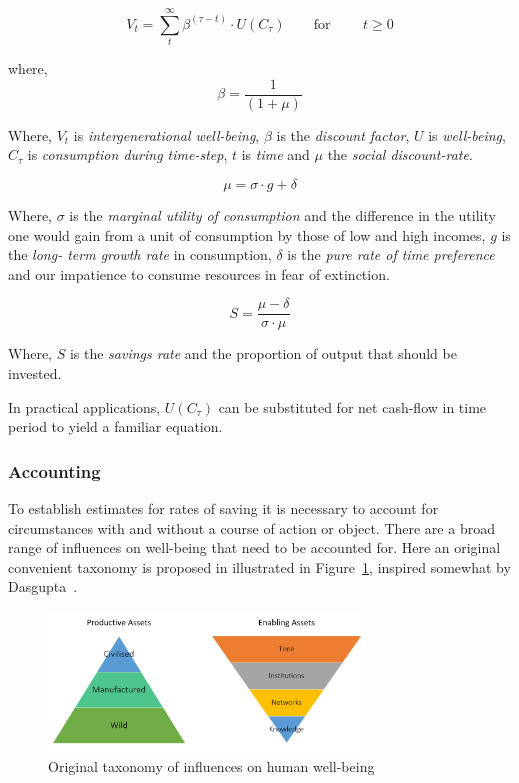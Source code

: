 \documentclass[11pt, oneside]{article}   	%
\begin{document}
\begin{equation}
V_t = \sum_t^\infty \beta^{(\tau - t)} \cdot U (C_\tau)
\qquad \text{for }
\qquad t \geq 0
\end{equation}

where,
\begin{equation}
\beta = \frac{1}{(1+\mu)}
\end{equation}

Where, $V_t$ is \emph{intergenerational well-being}, $\beta$ is the \emph{discount factor}, $U$ is \emph{well-being}, $C_\tau$ is \emph{consumption during time-step}, $t$ is \emph{time} and $\mu$ the \emph{social discount-rate}.

\begin{equation}
\mu = \sigma \cdot g + \delta
\end{equation}

Where, $\sigma$ is the \emph{marginal utility of consumption} and the difference in the utility one would gain from a unit of consumption by those of low and high incomes, $g$ is the \emph{long- term growth rate} in consumption, $\delta$ is the \emph{pure rate of time preference} and our impatience to consume resources in fear of extinction.

\begin{equation}
S = \frac{\mu-\delta}{\sigma \cdot \mu}
\end{equation}

Where, $S$ is the \emph{savings rate} and the proportion of output that should be invested.

In practical applications, $U (C_\tau)$ can be substituted for net cash-flow in time period to yield a familiar equation.

\subsubsection{Accounting}

To establish estimates for rates of saving it is necessary to account for circumstances with and without a course of action or object. There are a broad range of influences on well-being that need to be accounted for. Here an original convenient taxonomy is proposed in illustrated in Figure~\ref{Influences on well-being figure}, inspired somewhat by Dasgupta~\cite{pd3}.

\begin{figure}[h]
\begin{center}
\includegraphics[width=0.75\textwidth]{productiveAssetTaxonomy.png}
\caption{Original taxonomy of influences on human well-being}
\label{Influences on well-being figure}
\end{center}
\end{figure}
\end{document}
